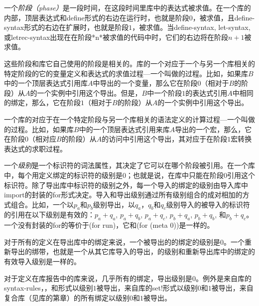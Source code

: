 %
一个\emph{阶段（phase）}是一段时间，在这段时间里库中的表达式被求值。在一个库的内部，顶层表达式和{\cf define}形式的右边在运行时，也就是阶段$0$，被求值，且{\cf define-syntax}形式的右边在扩展时，也就是阶段$1$，被求值。当{\cf define-syntax}, {\cf let-syntax}, 或{\cf letrec-syntax}出现在在阶段*n*被求值的代码中时，它们的右边将在阶段$n+1$被求值。

这些阶段和库它自己使用的阶段是相关的。库的一个对应于一个与另一个库相关的特定阶段的它的变量定义和表达式的求值过程---一个叫做的过程。比如，如果库$B$中的一个顶层表达式引用库$A$中导出的一个变量，那么它在阶段$0$（相对于$B$的阶段）从$A$的一个实例中引用这个导出。但是，$B$中一个阶段$1$的表达式引用$A$中相同的绑定，那么，它在阶段$1$（相对于$B$的阶段）从$A$的一个实例中引用这个导出。

一个库的对应于在一个特定阶段与另一个库相关的语法定义的计算过程—一个叫做的过程。比如，如果库$B$中的一个顶层表达式引用来库$A$导出的一个宏，那么，它在阶段$0$（相对应$B$的阶段）从$A$的访问中引用这个导出，其对应于在阶段$1$宏转换表达式的求职过程。

%
一个\emph{级别}是一个标识符的词法属性，其决定了它可以在哪个阶段被引用。在一个库中，每个用定义绑定的标识符的级别是$0$；也就是说，在库中只能在阶段$0$引用这个标识符。除了导出库中标识符的级别之外，每一个导入的绑定的级别由导入库中{\cf import}的封装的{\cf for}形式决定。导入和导出级别通过所有级别组合的成对相加的方式组合。比如，一个以$p_a$和$p_b$级别导出，以$q_a$，$q_b$和$q_c$级别导入的被导入的标识符的引用在以下级别是有效的：$p_a + q_a$, $p_a + q_b$, $p_a + q_c$, $p_b + q_a$, $p_b + q_b$, 和$p_b + q_c$。一个没有封装的{\cf for}的等价于{\cf (for  run)}，它和{\cf (for  (meta 0))}是一样的。

对于所有的定义在导出库中的绑定来说，一个被导出的的绑定的级别是$0$。一个重新导出的绑带，也就是一个从其它库导入的导出，的级别和重新导出库中的绑定的有效导入级别是一样的。

对于定义在库报告中的库来说，几乎所有的绑定，导出级别是$0$。例外是来自库的{\cf syntax-rules}，，\allowbreak{}和\allowbreak{}{\cf \_}\allowbreak{}形式以级别$1$被导出，来自库的{\cf set!}形式以级别$0$和$1$被导出，来自复合\thersixlibrary{}库（见库的第章）的所有绑定以级别$0$和$1$被导出。

